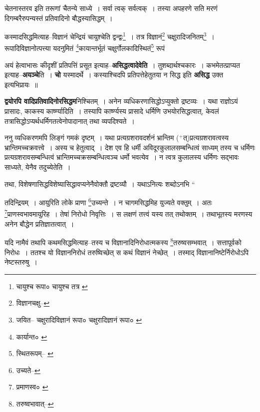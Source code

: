 \documentclass[article,12pt,a4paper]{memoir}
\newcommand{\add}[1]{($^{+}$#1)}
\begin{document}
	  \endgroup
	 

	  \pstart चेतनास्तरव इति तरूणां चैतन्ये साध्ये । सर्वा त्वक् सर्वत्वक् । तस्या अपहरणे सति मरणं दिगम्बरैरुपन्यस्तं प्रतिवादिनो बौद्धस्यासिद्धम् ।
	\pend
       

	  \pstart कस्मादसिद्धमित्याह--विज्ञानं चेन्द्रियं चायुश्चेति द्वन्द्वः\footnote{चायुश्च रूपा० \cite{dp-msA} \cite{dp-edP} \cite{dp-edH} चायुश्च तत्र \cite{dp-msB} \cite{dp-edN}} । तत्र विज्ञानं\footnote{विज्ञानचक्षु--\cite{dp-msB}} चक्षुरादिजनितम्\footnote{जयित--\cite{dp-msB} चक्षुरादिविज्ञानं रूपा० \cite{dp-edE} चक्षुरादिज्ञानं रूपा० \cite{dp-msC}} । रूपादिविज्ञानोत्पत्त्या यदनुमितं \footnote{कार्यान्त० \cite{dp-msB} \cite{dp-edP}}\-कायान्तर्भूतं चक्षुर्गोलकादिस्थितं\footnote{स्थितरूपम्--\cite{dp-msA} \cite{dp-msB} \cite{dp-edP} \cite{dp-edH} \cite{dp-edN}} रूपं
	\pend
      
	  \endgroup
	

	  \pstart अयं हेत्वाभासः कीदृशीं प्रतिपत्तिं प्रसूत इत्याह--\textbf{असिद्धत्वादेवेति} । तुशब्दार्थश्चकारः । कभमेतत्प्राप्यत इत्याह--\textbf{अयञ्चे}ति । \textbf{चो} यस्मादर्थे । कस्याश्चिदपि प्रतिपत्तेहेतुतया न सिद्ध इति \textbf{असिद्ध} उक्त इत्यभिप्रायः ॥
	\pend
      

	  \pstart \textbf{द्वयोरपि वादिप्रतिवादिनोरसिद्धम}निश्चितम् । अनेन व्यधिकरणासिद्धोऽप्युक्तो द्रष्टव्यः । यथा राज्ञोऽयं प्रासादः, काकस्य कार्ष्ण्यादिति । तस्यापि कार्ष्ण्यस्य प्रासादे धर्मिणि उभयोरसिद्धत्वात्, केवलं तत्रासिद्धोऽप्यर्थधर्मिगतत्वेनोपादानात् तथा व्यपदिश्यते ।
	\pend
      

	  \pstart ननु व्यधिकरणमपि लिङ्गं गमकं दृष्टम् । यथा प्रत्यग्रशरावदर्शनं भ्रान्तिम \add{त्}प्रत्यग्रशरावत्वस्य भ्रान्तिमच्चक्रवत्त्वे । अस्य च हेतुत्वाद् । देश एव हि धर्मी अविदूरकुलालसम्बन्धित्वं साध्यम् तस्य च धर्मिणः प्रत्यग्रशरावसम्बन्धित्वं भ्रान्तिमच्चक्रसम्बन्धित्वञ्च धर्मो भवत्येव । न त्वत्र कुलालस्य धर्मिणः सद्भावः साध्यते, येनैव तदुच्येतेति ।
	\pend
      

	  \pstart तथा, विशेषणासिद्धविशेष्यासिद्धावप्यनेनैवोक्तौ द्रष्टव्यौ । यथाऽनित्यः शब्दोऽनभि \leavevmode{} “
	  
	तदिन्द्रियम् । आयुरिति लोके प्राणा \footnote{उच्यते--\cite{dp-msB}}\-उच्यन्ते । न चागमसिद्धमिह युज्यते वक्तुम् । अतः \footnote{प्रमाणस्व० \cite{dp-edH}}\-प्राणस्वभावमायुरिह । तेषां निरोधो निवृत्तिः । स लक्षणं तत्त्वं यस्य तत् तथोक्तम् । तथाभूतस्य मरणस्य अनेन बौद्धेन प्रतिज्ञातत्वात् । 
	  
	यदि नामैवं तथापि कथमसिद्धमित्याह--तस्य च विज्ञानादिनिरोधात्मकस्य \footnote{तरुष्वभावात्--\cite{dp-msB}}\-तरुष्वसम्भवात् । सत्तापूर्वको निरोधः । ततश्च यो विज्ञाननिरोधं तरुष्विच्छेत् स कथं विज्ञानं नेच्छेत् । तस्माद् विज्ञानानिष्टेर्निरोधोऽपि नेष्टस्तरुषु । 
	  
\end{document}
